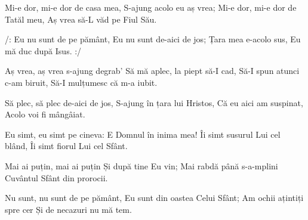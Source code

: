\beginverse
Mi-e dor, mi-e dor de casa mea,
S-ajung acolo eu aș vrea;
Mi-e dor, mi-e dor de Tatăl meu,
Aș vrea să-L văd pe Fiul Său.
\endverse

\beginchorus
/: Eu nu sunt de pe pământ,
Eu nu sunt de-aici de jos;
Țara mea e-acolo sus,
Eu mă duc după Isus. :/
\endchorus

\beginverse
Aș vrea, aș vrea s-ajung degrab'
Să mă aplec, la piept să-I cad,
Să-I spun atunci c-am biruit,
Să-I mulțumesc că m-a iubit.
\endverse

\beginverse
Să plec, să plec de-aici de jos,
S-ajung în țara lui Hristos,
Că eu aici am suspinat,
Acolo voi fi mângâiat.
\endverse

\beginverse
Eu simt, eu simt pe cineva:
E Domnul în inima mea!
Îi simt susurul Lui cel blând,
Îi simt fiorul Lui cel Sfânt.
\endverse

\beginverse
Mai ai puțin, mai ai puțin
Și după tine Eu vin;
Mai rabdă până s-a-mplini
Cuvântul Sfânt din prorocii.
\endverse

\beginverse
Nu sunt, nu sunt de pe pământ,
Eu sunt din oastea Celui Sfânt;
Am ochii ațintiți spre cer
Și de necazuri nu mă tem.
\endverse
\endsong